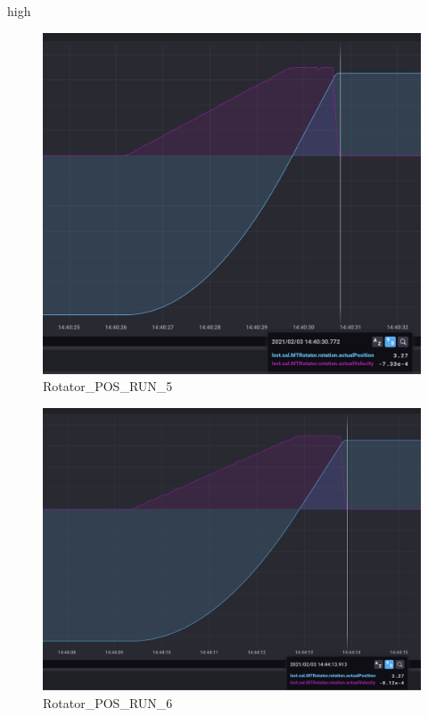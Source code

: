 high\documentclass[SE,lsstdraft,authoryear,toc]{lsstdoc}
\begin{document}
\begin{figure}[h!]
  \includegraphics[width=\linewidth]{media/Rotator_design_speed_pos_test5.png}
  \caption{Rotator\_POS\_RUN\_5}
  \label{fig:Rotator_POS_RUN_5}
\end{figure}
\begin{figure}[h!]
  \includegraphics[width=\linewidth]{media/Rotator_design_speed_pos_test6.png}
  \caption{Rotator\_POS\_RUN\_6}
  \label{fig:Rotator_POS_RUN_6}
\end{figure}
\end{document}
